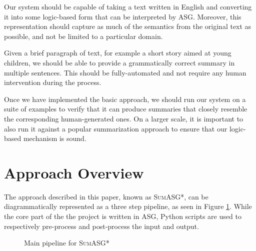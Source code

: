 \begin{objective}
Our system should be capable of taking a text written in English and converting it into some logic-based form that can be interpreted by ASG. Moreover, this representation should capture as much of the semantics from the original text as possible, and not be limited to a particular domain.
\end{objective}

\begin{objective}
Given a brief paragraph of text, for example a short story aimed at young children, we should be able to provide a grammatically correct summary in multiple sentences. This should be fully-automated and not require any human intervention during the process.
\end{objective}

\begin{objective}
Once we have implemented the basic approach, we should run our system on a suite of examples to verify that it can produce summaries that closely resemble the corresponding human-generated ones. On a larger scale, it is important to also run it against a popular summarization approach to ensure that our logic-based mechanism is sound.
\end{objective}

\section{Approach Overview}
\label{sec:approach_overview}

The approach described in this paper, known as \textsc{SumASG*}, can be diagrammatically represented as a three step pipeline, as seen in Figure \ref{fig:main_pipeline}. While the core part of the the project is written in ASG, Python scripts are used to respectively pre-process and post-process the input and output.

{
\begin{figure}[H]
\centering
{}
\caption{Main pipeline for \textsc{SumASG*}}
\label{fig:main_pipeline}
\end{figure}
}


